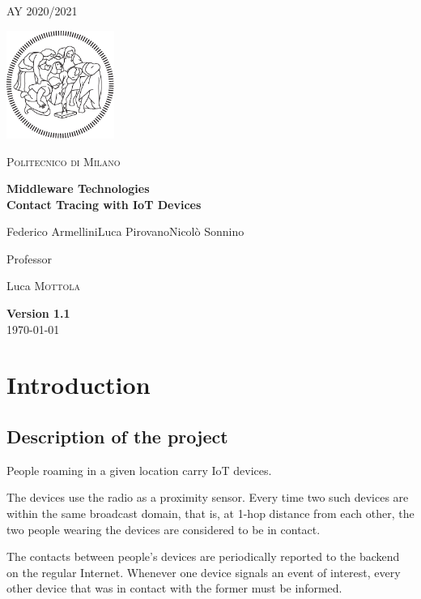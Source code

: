\documentclass[table, 12pt]{article}
\begin{document}
\begin{titlepage}
    \centering
    {\scshape\large AY 2020/2021 \par}
    \vfill
    \includegraphics[width=100pt]{assets/logo-polimi-new}\par\vspace{1cm}
    {\scshape\LARGE Politecnico di Milano \par}
    \vspace{1.5cm}
    {\huge\bfseries Middleware Technologies\\Contact Tracing with IoT Devices\par}
    \vspace{2cm}
    {\Large {Federico Armellini\quad Luca Pirovano\quad Nicolò Sonnino}\par}
    \vfill
    {\large Professor\par
        Luca \textsc{Mottola}}
    \vfill
    {\large \textbf{Version 1.1}\\ \today \par}
\end{titlepage}
\thispagestyle{plain}
\mbox{}
\newpage
{}
\tableofcontents
\newpage
{}
\section{Introduction}
\subsection{Description of the project}
People roaming in a given location carry IoT devices.

The devices use the radio as a proximity sensor. Every time
two such devices are within the same broadcast domain, that is, at 1-hop distance from each other, the two
people wearing the devices are considered to be in contact.

The contacts between people’s devices are
periodically reported to the backend on the regular Internet. Whenever one device signals an event of interest,
every other device that was in contact with the former must be informed.
\end{document}
